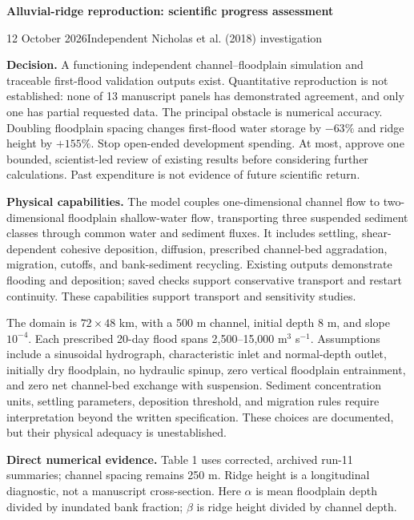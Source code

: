 \documentclass[10pt,letterpaper]{article}
\begin{document}
{\Large\bfseries Alluvial-ridge reproduction: scientific progress assessment}\par
12 October 2026\quad Independent Nicholas et al. (2018) investigation

\textbf{Decision.} A functioning independent channel--floodplain simulation and traceable first-flood validation outputs exist. Quantitative reproduction is not established: none of 13 manuscript panels has demonstrated agreement, and only one has partial requested data. The principal obstacle is numerical accuracy. Doubling floodplain spacing changes first-flood water storage by $-63\%$ and ridge height by $+155\%$. Stop open-ended development spending. At most, approve one bounded, scientist-led review of existing results before considering further calculations. Past expenditure is not evidence of future scientific return.

\textbf{Physical capabilities.} The model couples one-dimensional channel flow to two-dimensional floodplain shallow-water flow, transporting three suspended sediment classes through common water and sediment fluxes. It includes settling, shear-dependent cohesive deposition, diffusion, prescribed channel-bed aggradation, migration, cutoffs, and bank-sediment recycling. Existing outputs demonstrate flooding and deposition; saved checks support conservative transport and restart continuity. These capabilities support transport and sensitivity studies.

The domain is $72\times48$ km, with a 500 m channel, initial depth 8 m, and slope $10^{-4}$. Each prescribed 20-day flood spans 2,500--15,000 m$^3$ s$^{-1}$. Assumptions include a sinusoidal hydrograph, characteristic inlet and normal-depth outlet, initially dry floodplain, no hydraulic spinup, zero vertical floodplain entrainment, and zero net channel-bed exchange with suspension. Sediment concentration units, settling parameters, deposition threshold, and migration rules require interpretation beyond the written specification. These choices are documented, but their physical adequacy is unestablished.

\textbf{Direct numerical evidence.} Table 1 uses corrected, archived run-11 summaries; channel spacing remains 250 m. Ridge height is a longitudinal diagnostic, not a manuscript cross-section. Here $\alpha$ is mean floodplain depth divided by inundated bank fraction; $\beta$ is ridge height divided by channel depth.
\end{document}

